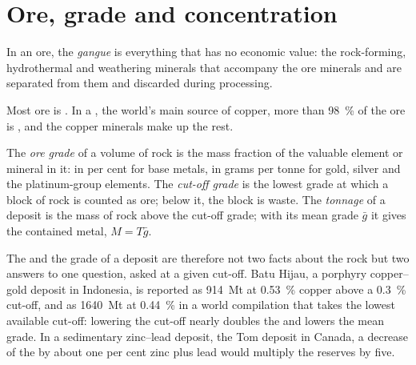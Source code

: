 \section{Ore, grade and concentration}\label{sec:b2:ore-deposits:grade}

\begin{definition}[Gangue]\label{def:b2:ore-deposits:ore}
In an ore, the \emph{gangue} is everything that has no economic value: the
rock-forming, hydrothermal and weathering minerals that accompany the ore minerals and are
separated from them and discarded during processing.
\end{definition}

Most ore is . In a , the world's main source of copper, more than
\qty{98}{\percent} of the ore is , and the copper minerals make up the rest.

\begin{definition}\label{def:b2:ore-deposits:grade}
The \emph{ore grade} of a volume of rock is the mass fraction of the valuable
element or mineral in it: in per cent for base metals, in grams per tonne for gold, silver and the
platinum-group elements. The \emph{cut-off grade} is the lowest grade at
which a block of rock is counted as ore; below it, the block is waste. The
\emph{tonnage} of a deposit is the mass of rock above the cut-off grade; with its
mean grade $\bar g$ it gives the contained metal, $M = T\bar g$.
\end{definition}

The  and the grade of a deposit are therefore not two facts about the rock but two
answers to one question, asked at a given cut-off. Batu Hijau, a porphyry copper--gold deposit in
Indonesia, is reported as \qty{914}{Mt} at \qty{0.53}{\percent} copper above a
\qty{0.3}{\percent} cut-off, and as \qty{1640}{Mt} at \qty{0.44}{\percent} in a world compilation
that takes the lowest available cut-off: lowering the cut-off nearly doubles the  and
lowers the mean grade. In a sedimentary zinc--lead deposit, the Tom deposit in Canada, a decrease
of the  by about one per cent zinc plus lead would multiply the reserves by five.

